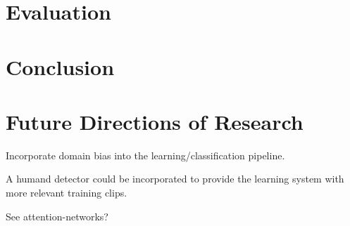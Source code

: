 \section{Evaluation}

\section{Conclusion}

\section{Future Directions of Research}
\label{sec:future_work}
Incorporate domain bias into the learning/classification pipeline.

A humand detector could be incorporated to provide the learning system with more relevant training clips.

See attention-networks?
